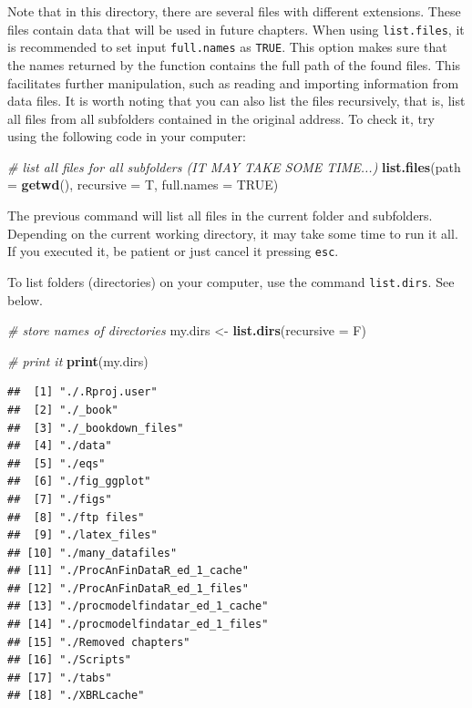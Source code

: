 \documentclass[11pt,]{book}
\newenvironment{Shaded}{\begin{snugshade}}{\end{snugshade}}
\newcommand{\KeywordTok}[1]{\textcolor[rgb]{0.27,0.27,0.27}{\textbf{#1}}}
\newcommand{\DataTypeTok}[1]{\textcolor[rgb]{0.27,0.27,0.27}{#1}}
\newcommand{\StringTok}[1]{\textcolor[rgb]{0.5,0.5,0.5}{#1}}
\newcommand{\CommentTok}[1]{\textcolor[rgb]{0.56,0.35,0.01}{\textit{#1}}}
\newcommand{\OtherTok}[1]{\textcolor[rgb]{0.56,0.35,0.01}{#1}}
\newcommand{\NormalTok}[1]{#1}
\begin{document}
Note that in this directory, there are several files with different
extensions. These files contain data that will be used in future
chapters. When using \texttt{list.files}, it is recommended to set input
\texttt{full.names} as \texttt{TRUE}. This option makes sure that the
names returned by the function contains the full path of the found
files. This facilitates further manipulation, such as reading and
importing information from data files. It is worth noting that you can
also list the files recursively, that is, list all files from all
subfolders contained in the original address. To check it, try using the
following code in your computer:

\begin{Shaded}
\begin{Highlighting}[]
\CommentTok{# list all files for all subfolders (IT MAY TAKE SOME TIME...)}
\KeywordTok{list.files}\NormalTok{(}\DataTypeTok{path =} \KeywordTok{getwd}\NormalTok{(), }\DataTypeTok{recursive =}\NormalTok{ T, }\DataTypeTok{full.names =} \OtherTok{TRUE}\NormalTok{)}
\end{Highlighting}
\end{Shaded}

The previous command will list all files in the current folder and
subfolders. Depending on the current working directory, it may take some
time to run it all. If you executed it, be patient or just cancel it
pressing \texttt{esc}.

To list folders (directories) on your computer, use the command
\texttt{list.dirs}. See below. 

\begin{Shaded}
\begin{Highlighting}[]
\CommentTok{# store names of directories}
\NormalTok{my.dirs <-}\StringTok{ }\KeywordTok{list.dirs}\NormalTok{(}\DataTypeTok{recursive =}\NormalTok{ F)}

\CommentTok{# print it}
\KeywordTok{print}\NormalTok{(my.dirs)}
\end{Highlighting}
\end{Shaded}

\begin{verbatim}
##  [1] "./.Rproj.user"                 
##  [2] "./_book"                       
##  [3] "./_bookdown_files"             
##  [4] "./data"                        
##  [5] "./eqs"                         
##  [6] "./fig_ggplot"                  
##  [7] "./figs"                        
##  [8] "./ftp files"                   
##  [9] "./latex_files"                 
## [10] "./many_datafiles"              
## [11] "./ProcAnFinDataR_ed_1_cache"   
## [12] "./ProcAnFinDataR_ed_1_files"   
## [13] "./procmodelfindatar_ed_1_cache"
## [14] "./procmodelfindatar_ed_1_files"
## [15] "./Removed chapters"            
## [16] "./Scripts"                     
## [17] "./tabs"                        
## [18] "./XBRLcache"
\end{verbatim}
\end{document}
